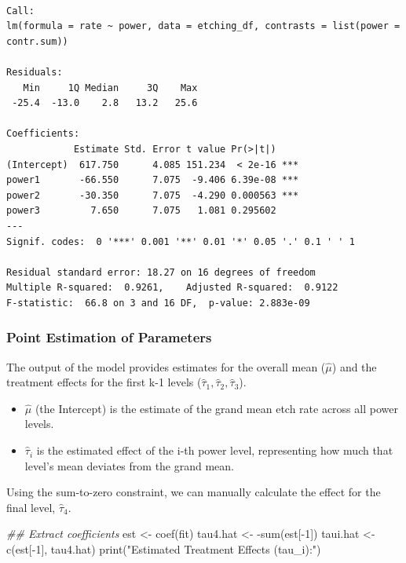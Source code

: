 \documentclass[
  letterpaper,
]{scrbook}
\newenvironment{Shaded}{\begin{snugshade}}{\end{snugshade}}
\newcommand{\DecValTok}[1]{\textcolor[rgb]{0.68,0.00,0.00}{#1}}
\newcommand{\DocumentationTok}[1]{\textcolor[rgb]{0.37,0.37,0.37}{\textit{#1}}}
\newcommand{\FunctionTok}[1]{\textcolor[rgb]{0.28,0.35,0.67}{#1}}
\newcommand{\NormalTok}[1]{\textcolor[rgb]{0.00,0.23,0.31}{#1}}
\newcommand{\OtherTok}[1]{\textcolor[rgb]{0.00,0.23,0.31}{#1}}
\newcommand{\SpecialCharTok}[1]{\textcolor[rgb]{0.37,0.37,0.37}{#1}}
\newcommand{\StringTok}[1]{\textcolor[rgb]{0.13,0.47,0.30}{#1}}
\providecommand{\tightlist}{%
  \setlength{\itemsep}{0pt}\setlength{\parskip}{0pt}}\usepackage{longtable,booktabs,array}
\begin{document}
\begin{verbatim}

Call:
lm(formula = rate ~ power, data = etching_df, contrasts = list(power = contr.sum))

Residuals:
   Min     1Q Median     3Q    Max 
 -25.4  -13.0    2.8   13.2   25.6 

Coefficients:
            Estimate Std. Error t value Pr(>|t|)    
(Intercept)  617.750      4.085 151.234  < 2e-16 ***
power1       -66.550      7.075  -9.406 6.39e-08 ***
power2       -30.350      7.075  -4.290 0.000563 ***
power3         7.650      7.075   1.081 0.295602    
---
Signif. codes:  0 '***' 0.001 '**' 0.01 '*' 0.05 '.' 0.1 ' ' 1

Residual standard error: 18.27 on 16 degrees of freedom
Multiple R-squared:  0.9261,    Adjusted R-squared:  0.9122 
F-statistic:  66.8 on 3 and 16 DF,  p-value: 2.883e-09
\end{verbatim}

\subsubsection{Point Estimation of
Parameters}\label{point-estimation-of-parameters}

The output of the model provides estimates for the overall mean
(\(\hat{\mu}\)) and the treatment effects for the first k-1 levels
(\(\hat{\tau}_1, \hat{\tau}_2, \hat{\tau}_3\)).

\begin{itemize}
\tightlist
\item
  \(\hat{\mu}\) (the Intercept) is the estimate of the grand mean etch
  rate across all power levels.
\item
  \(\hat{\tau}_i\) is the estimated effect of the i-th power level,
  representing how much that level's mean deviates from the grand mean.
\end{itemize}

Using the sum-to-zero constraint, we can manually calculate the effect
for the final level, \(\hat{\tau}_4\).

\begin{Shaded}
\begin{Highlighting}[]
\DocumentationTok{\#\# Extract coefficients}
\NormalTok{est }\OtherTok{\textless{}{-}} \FunctionTok{coef}\NormalTok{(fit)}
\NormalTok{tau4.hat }\OtherTok{\textless{}{-}} \SpecialCharTok{{-}}\FunctionTok{sum}\NormalTok{(est[}\SpecialCharTok{{-}}\DecValTok{1}\NormalTok{])}
\NormalTok{taui.hat }\OtherTok{\textless{}{-}} \FunctionTok{c}\NormalTok{(est[}\SpecialCharTok{{-}}\DecValTok{1}\NormalTok{], tau4.hat)}
\FunctionTok{print}\NormalTok{(}\StringTok{"Estimated Treatment Effects (tau\_i):"}\NormalTok{)}
\end{Highlighting}
\end{Shaded}
\end{document}
